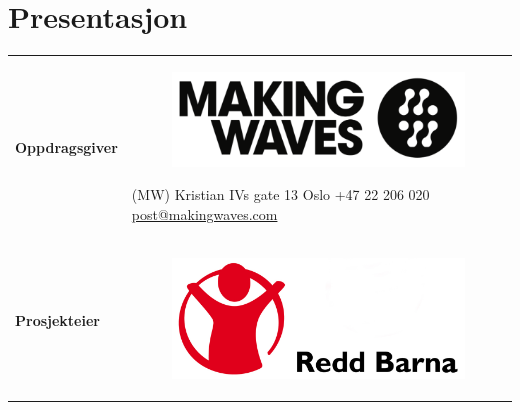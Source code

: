 \chapter{Presentasjon}
\vspace{-1.5cm}
\begin{flushleft}
\renewcommand{\arraystretch}{1.5}
\begin{tabular}[ht]{@{}lp{100mm}@{}}
\textbf{Oppdragsgiver} & 
\begin{figure}
\vspace{-0.75cm}
\hspace{-2.5cm}
\includegraphics[scale=0.15, keepaspectratio]{./img/presentasjon/mw_logo.png}
\end{figure}
\vspace{-0.5cm}
\href{http://www.makingwaves.no/}{\mw{}} (MW) \newline Kristian IVs gate 13 \newline 0164 Oslo \newline +47 22 206 020 \newline \href{mailto:post@makingwaves.com}{post@makingwaves.com} \\
\textbf{Prosjekteier} & 
\begin{figure}
\vspace{-0.75cm}
\hspace{-2.5cm}
\includegraphics[scale=0.075, keepaspectratio]{./img/presentasjon/rb_logo.jpg}
\end{figure}
\vspace{-0.5cm}

\end{tabular}
\end{flushleft}

